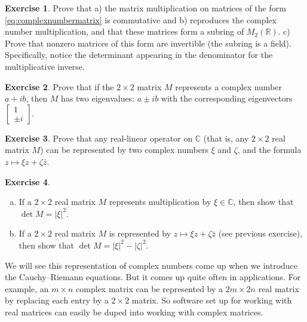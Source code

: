 \documentclass[12pt,openany]{book}
\newcommand{\sabs}[1]{\lvert {#1} \rvert}
\newcommand{\C}{{\mathbb{C}}}
\newcommand{\R}{{\mathbb{R}}}
\theoremstyle{plain}
\theoremstyle{remark}
\theoremstyle{definition}
\newenvironment{exbox}{%
    \def\FrameCommand{\vrule width 1pt \relax\hspace{10pt}}%
    \MakeFramed{\advance\hsize-\width\FrameRestore}%
}{%
    \endMakeFramed
}
\newenvironment{exparts}{%
    \leavevmode\begin{enumerate}[a),noitemsep,topsep=0pt,parsep=0pt,partopsep=0pt]
}{%
    \end{enumerate}
}
\theoremstyle{exercise}
\newtheorem{exercise}{Exercise}[section]
\theoremstyle{example}
\begin{document}
\begin{exbox}
\begin{exercise}
Prove that a) the matrix multiplication on matrices of the form
\eqref{eq:complexnumbermatrix}
is commutative and b) reproduces the complex
number multiplication, and that these matrices form a subring of $M_2(\R)$.
c) Prove that nonzero matrices of this form are
invertible (the subring is a field).  Specifically, notice the
determinant appearing in the denominator for the multiplicative inverse.
\end{exercise}

\begin{exercise}
Prove that if the $2 \times 2$ matrix $M$ represents a complex number
$a+ib$, then $M$ has two eigenvalues: $a \pm i b$ with the corresponding
eigenvectors $\left[ \begin{smallmatrix} 1 \\ \pm i \end{smallmatrix}
\right]$.
\end{exercise}

\begin{exercise} \label{exercise:reallinmap}
Prove that any real-linear operator on $\C$ (that is, any 
$2 \times 2$ real matrix $M$) can be represented 
by two complex numbers $\xi$ and $\zeta$, and the formula
$z \mapsto \xi z + \zeta \bar{z}$.
\end{exercise}

\begin{exercise}
\begin{exparts}
\item
If a $2 \times 2$ real matrix $M$ represents multiplication by $\xi \in \C$,
then show that $\det M = \sabs{\xi}^2$.
\item
If a $2 \times 2$ real matrix $M$ is represented by $z \mapsto \xi z + \zeta
\bar{z}$ (see previous exercise),
then show that $\det M = \sabs{\xi}^2 - \sabs{\zeta}^2$.
\end{exparts}
\end{exercise}
\end{exbox}

We will see this representation of complex numbers come up when we introduce the
Cauchy--Riemann equations.  But it comes up quite often in applications.
For example, 
an $m \times n$ complex matrix can be represented by a
$2m \times 2n$ real matrix by replacing each entry by a $2 \times 2$ matrix.
So software set up for working with real matrices can easily be duped into
working with complex matrices.
\end{document}

